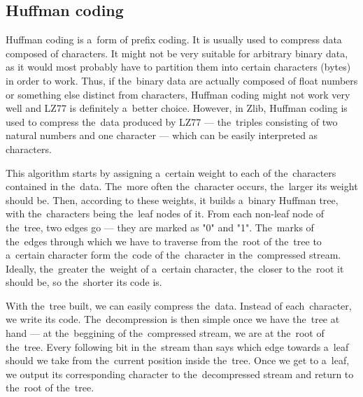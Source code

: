 \subsection*{Huffman coding}\label{subsec:huffman}

Huffman coding is a~form of prefix coding. It is usually used to compress data composed of characters. It might not be very suitable for arbitrary binary data, as it would most probably have to partition them into certain characters (bytes) in order to work. Thus, if the~binary data are actually composed of float numbers or something else distinct from characters, Huffman coding might not work very well and LZ77 is definitely a~better choice. However, in Zlib, Huffman coding is used to compress the~data produced by LZ77 --- the~triples consisting of two natural numbers and one character --- which can be easily interpreted as characters.

This algorithm starts by assigning a~certain weight to each of the~characters contained in the~data. The~more often the~character occurs, the~larger its weight should be. Then, according to these weights, it builds a~binary Huffman tree, with the~characters being the~leaf nodes of it. From each non-leaf node of the~tree, two edges go --- they are marked as "0" and "1". The~marks of the~edges through which we have to traverse from the~root of the~tree to a~certain character form the~code of the~character in the~compressed stream. Ideally, the~greater the~weight of a~certain character, the~closer to the~root it should be, so the~shorter its code is.

With the~tree built, we can easily compress the~data. Instead of each~character, we write its code. The~decompression is then simple once we have the~tree at hand --- at the~beggining of the~compressed stream, we are at the~root of the~tree. Every following bit in the~stream than says which edge towards a~leaf should we take from the~current position inside the~tree. Once we get to a~leaf, we output its corresponding character to the~decompressed stream and return to the~root of the~tree.


